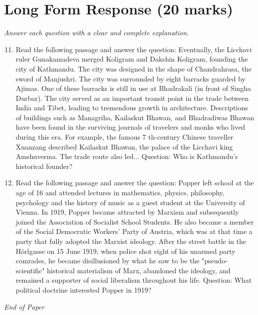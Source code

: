 \documentclass[12pt]{article}
\begin{document}
\section*{Long Form Response (20 marks)}
\textit{Answer each question with a clear and complete explanation.}
\begin{enumerate}[label=\arabic*.]
\setcounter{enumi}{10}
\item Read the following passage and answer the question: Eventually, the Licchavi ruler Gunakamadeva merged Koligram and Dakshin Koligram, founding the city of Kathmandu. The city was designed in the shape of Chandrahrasa, the sword of Manjushri. The city was surrounded by eight barracks guarded by Ajimas. One of these barracks is still in use at Bhadrakali (in front of Singha Durbar). The city served as an important transit point in the trade between India and Tibet, leading to tremendous growth in architecture. Descriptions of buildings such as Managriha, Kailaskut Bhawan, and Bhadradiwas Bhawan have been found in the surviving journals of travelers and monks who lived during this era. For example, the famous 7 th-century Chinese traveller Xuanzang described Kailaskut Bhawan, the palace of the Licchavi king Amshuverma. The trade route also led... Question: Who is Kathmandu's historical founder?
\item Read the following passage and answer the question: Popper left school at the age of 16 and attended lectures in mathematics, physics, philosophy, psychology and the history of music as a guest student at the University of Vienna. In 1919, Popper became attracted by Marxism and subsequently joined the Association of Socialist School Students. He also became a member of the Social Democratic Workers' Party of Austria, which was at that time a party that fully adopted the Marxist ideology. After the street battle in the Hörlgasse on 15 June 1919, when police shot eight of his unarmed party comrades, he became disillusioned by what he saw to be the "pseudo-scientific" historical materialism of Marx, abandoned the ideology, and remained a supporter of social liberalism throughout his life. Question: What political doctrine interested Popper in 1919?
\end{enumerate}

\vfill
\noindent\textit{End of Paper}
\end{document}
